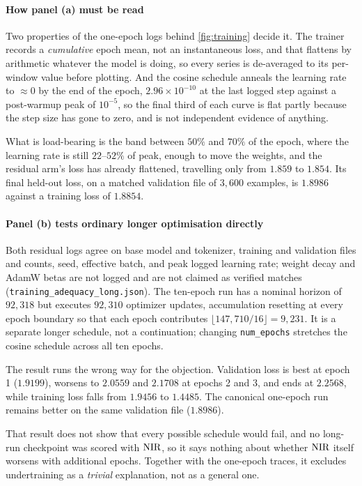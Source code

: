 \paragraph{How panel (a) must be read} Two properties of the one-epoch logs behind
\cref{fig:training} decide it. The trainer records a
\emph{cumulative} epoch mean, not an instantaneous loss, and that flattens by
arithmetic whatever the model is doing, so every series is de-averaged to its
per-window value before plotting. And the cosine schedule anneals the learning
rate to $\approx 0$ by the end of the epoch, $2.96 \times 10^{-10}$ at the last
logged step against a post-warmup peak of $10^{-5}$, so the final third of each
curve is flat partly because the step size has gone to zero, and is not
independent evidence of anything.

What is load-bearing is the band between $50\%$ and $70\%$ of the epoch, where
the learning rate is still $22$--$52\%$ of peak, enough to move the weights, and
the residual arm's loss has already flattened, travelling only from $1.859$ to
$1.854$. Its final held-out loss, on a matched validation file of $3{,}600$
examples, is $1.8986$ against a training loss of $1.8854$.

\paragraph{Panel (b) tests ordinary longer optimisation directly} Both residual
logs agree on base model and tokenizer,
training and validation files and counts, seed, effective batch, and peak logged
learning rate; weight decay and AdamW betas are not logged and are not claimed
as verified matches (\texttt{training\_adequacy\_}\allowbreak\texttt{long.json}). The ten-epoch run
has a nominal horizon of $92{,}318$ but executes $92{,}310$ optimizer updates,
accumulation resetting at every epoch boundary so that each epoch contributes
$\lfloor147{,}710/16\rfloor=9{,}231$. It is a separate longer schedule, not a
continuation; changing \texttt{num\_epochs} stretches the cosine schedule across
all ten epochs.

The result runs the wrong way for the objection. Validation loss is best at
epoch 1 ($1.9199$), worsens to $2.0559$ and $2.1708$ at epochs 2 and 3, and ends
at $2.2568$, while training loss falls from $1.9456$ to $1.4485$. The canonical
one-epoch run remains better on the same validation file ($1.8986$).

\begin{scopelimit}
That result does not show that every possible schedule would fail, and no
long-run checkpoint was scored with $\textrm{NIR}$, so it says nothing about whether
$\textrm{NIR}$ itself worsens with additional epochs. Together with the one-epoch
traces, it excludes undertraining as a \emph{trivial} explanation, not as a
general one.
\end{scopelimit}

